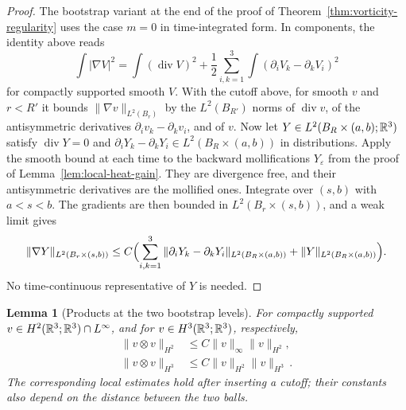 \documentclass[11pt,letterpaper]{article}
\numberwithin{equation}{section}
\theoremstyle{plain}
\newtheorem{lemma}[theorem]{Lemma}
\theoremstyle{definition}
\theoremstyle{remark}
\begin{document}
\begin{proof}
The bootstrap variant at the end of the proof of Theorem~\ref{thm:vorticity-regularity} uses the case $m=0$ in time-integrated form. In components, the identity above reads
\[
 \int|\nabla V|^2=\int(\operatorname{div}V)^2
   +\frac12\sum_{i,k=1}^3\int(\partial_iV_k-\partial_kV_i)^2
\]
for compactly supported smooth $V$. With the cutoff above, for smooth $v$ and $r<R'$ it bounds $\|\nabla v\|_{L^2(B_r)}$ by the $L^2(B_{R'})$ norms of $\operatorname{div}v$, of the antisymmetric derivatives $\partial_iv_k-\partial_kv_i$, and of $v$. Now let $Y\in L^2(B_R\times(a,b);\mathbb{R}^3)$ satisfy $\operatorname{div}Y=0$ and $\partial_iY_k-\partial_kY_i\in L^2(B_R\times(a,b))$ in distributions. Apply the smooth bound at each time to the backward mollifications $Y_\varepsilon$ from the proof of Lemma~\ref{lem:local-heat-gain}. They are divergence free, and their antisymmetric derivatives are the mollified ones. Integrate over $(s,b)$ with $a<s<b$. The gradients are then bounded in $L^2(B_r\times(s,b))$, and a weak limit gives
\[
 \|\nabla Y\|_{L^2(B_r\times(s,b))}
 \le C\Bigl(\sum_{i,k=1}^3\|\partial_iY_k-\partial_kY_i\|_{L^2(B_R\times(a,b))}
       +\|Y\|_{L^2(B_R\times(a,b))}\Bigr).
\]
No time-continuous representative of $Y$ is needed.
\end{proof}

\begin{lemma}[Products at the two bootstrap levels]\label{lem:vorticity-products}
For compactly supported $v\in H^2(\mathbb{R}^3;\mathbb{R}^3)\cap L^\infty$, and for $v\in H^3(\mathbb{R}^3;\mathbb{R}^3)$, respectively,
\begin{align}
 \|v\otimes v\|_{H^2}&\le C\|v\|_\infty\|v\|_{H^2},\label{eq:vorticity-product-h2}\\
 \|v\otimes v\|_{H^3}&\le C\|v\|_{H^2}\|v\|_{H^3}\,.
 \label{eq:vorticity-product-h3}
\end{align}
The corresponding local estimates hold after inserting a cutoff; their constants also depend on the distance between the two balls.
\end{lemma}
\end{document}

